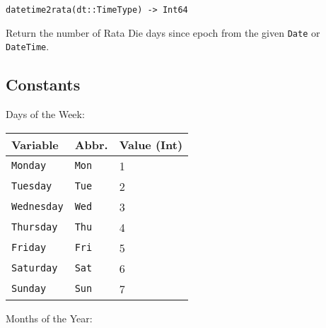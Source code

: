 \begin{adjustwidth}{2em}{0pt}


\begin{verbatim}
datetime2rata(dt::TimeType) -> Int64
\end{verbatim}

Return the number of Rata Die days since epoch from the given \texttt{Date} or \texttt{DateTime}.



\end{adjustwidth}

\hypertarget{15375320667239362911}{}


\subsection{Constants}



Days of the Week:




\begin{table}[h]

\begin{tabulary}{\linewidth}{|L|L|L|}
\hline
Variable & Abbr. & Value (Int) \\
\hline
\texttt{Monday} & \texttt{Mon} & 1 \\
\hline
\texttt{Tuesday} & \texttt{Tue} & 2 \\
\hline
\texttt{Wednesday} & \texttt{Wed} & 3 \\
\hline
\texttt{Thursday} & \texttt{Thu} & 4 \\
\hline
\texttt{Friday} & \texttt{Fri} & 5 \\
\hline
\texttt{Saturday} & \texttt{Sat} & 6 \\
\hline
\texttt{Sunday} & \texttt{Sun} & 7 \\
\hline
\end{tabulary}

\end{table}



Months of the Year:




